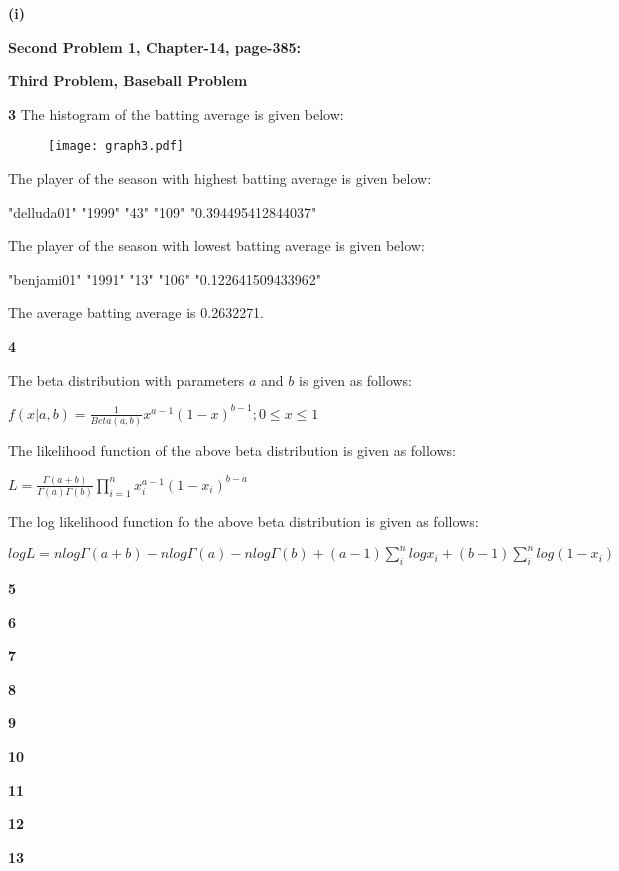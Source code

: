 \documentclass[12pt]{article}
\begin{document}
\textbf{(i)}

\textbf{Second Problem 1, Chapter-14, page-385:}

\textbf{Third Problem, Baseball Problem}

\textbf{3}
The histogram of the batting average is given below:

\begin{figure}[h]
\centering
\texttt{[image: graph3.pdf]}
\end{figure}

The player of the season with highest batting average is given below:

"delluda01" "1999" "43" "109" "0.394495412844037"

The player of the season with lowest batting average is given below:

"benjami01" "1991" "13" "106" "0.122641509433962"

The average batting average is  0.2632271.

\textbf{4}

The beta distribution with parameters $a$ and $b$ is given as follows:

$f(x|a,b)=\frac{1}{Beta(a,b)}x^{a-1}(1-x)^{b-1}; 0\leq x \leq 1$

The likelihood function of the above beta distribution is given as follows:

$L=\frac{\Gamma(a+b)}{\Gamma(a)\Gamma(b)}\prod_{i=1}^{n}x_{i}^{a-1}(1-x_{i})^{b-a}$

The log likelihood function fo the above beta distribution is given as follows:

$logL=nlog\Gamma(a+b)-nlog\Gamma(a)-nlog\Gamma(b)+(a-1)\sum_{i}^{n}logx_{i}+(b-1)\sum_{i}^{n}log(1-x_{i})$

\textbf{5}

\textbf{6}

\textbf{7}

\textbf{8}

\textbf{9}

\textbf{10}

\textbf{11}

\textbf{12}

\textbf{13}
\end{document}
